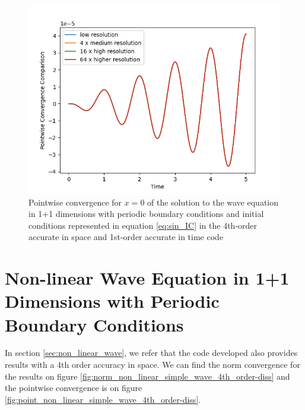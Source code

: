 \begin{figure}[H]
    \centering
    \includegraphics[width=0.9\columnwidth]{Images/simple_wave-4th-point.png}
    \caption{Pointwise convergence for $x = 0$ of the solution to the wave equation in 1+1 dimensions with periodic boundary conditions and initial conditions represented in equation \ref{eq:sin_IC} in the 4th-order accurate in space and 1st-order accurate in time code}
    \label{fig:point_simple_wave_4th_order}
\end{figure}

\newpage


\section{Non-linear Wave Equation in 1+1 Dimensions with Periodic Boundary Conditions}

In section \ref{sec:non_linear_wave}, we refer that the code developed also provides results with a 4th order accuracy in space. We can find the norm convergence for the results on figure \ref{fig:norm_non_linear_simple_wave_4th_order-diss} and the pointwise convergence is on figure \ref{fig:point_non_linear_simple_wave_4th_order-diss}.

